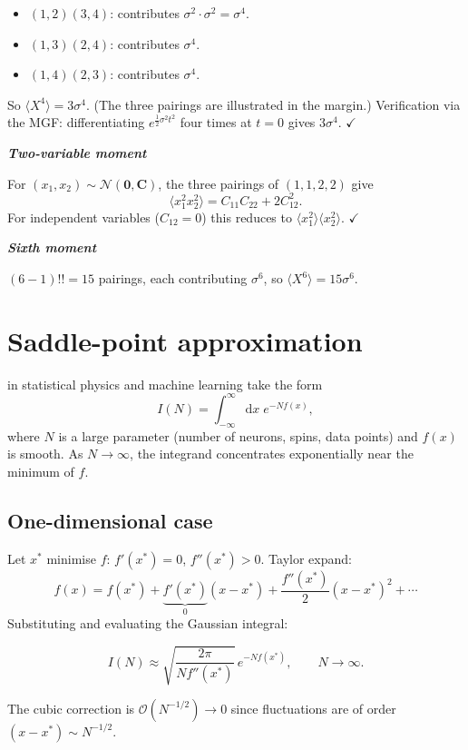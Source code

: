 \documentclass[justified,notoc]{tufte-handout}
\def\d{\mathrm{d}}
\def\N{\mathcal{N}}
\renewcommand{\vec}[1]{\mathbf{#1}}
\begin{document}
\begin{itemize}[leftmargin=*]
  \item $(1,2)(3,4)$: contributes $\sigma^2\cdot\sigma^2=\sigma^4$.
  \item $(1,3)(2,4)$: contributes $\sigma^4$.
  \item $(1,4)(2,3)$: contributes $\sigma^4$.
\end{itemize}
So $\langle X^4\rangle=3\sigma^4$. (The three pairings are illustrated in the margin.) Verification via the MGF: differentiating $e^{\frac{1}{2}\sigma^2 t^2}$ four times at $t=0$ gives $3\sigma^4$. $\checkmark$

\noindent\textit{\textbf{Two-variable moment}}\quad

For $(x_1,x_2)\sim\N(\vec{0},\mathbf{C})$, the three pairings of $(1,1,2,2)$ give
\begin{equation}
  \langle x_1^2 x_2^2\rangle=C_{11}C_{22}+2C_{12}^2.
\end{equation}
For independent variables ($C_{12}=0$) this reduces to $\langle x_1^2\rangle\langle x_2^2\rangle$. $\checkmark$

\noindent\textit{\textbf{Sixth moment}}\quad

$(6-1)!!=15$ pairings, each contributing $\sigma^6$, so $\langle X^6\rangle=15\sigma^6$.

\section{Saddle-point approximation}
\label{sec:saddle_point}

 in statistical physics and machine learning take the form
\begin{equation}
  I(N)=\int_{-\infty}^{\infty}\d x\; e^{-Nf(x)},
  \label{eq:laplace_integral}
\end{equation}
where $N$ is a large parameter (number of neurons, spins, data points) and $f(x)$ is smooth. As $N\to\infty$, the integrand concentrates exponentially near the minimum of $f$.

\subsection{One-dimensional case}

Let $x^*$ minimise $f$: $f'(x^*)=0$, $f''(x^*)>0$. Taylor expand:
\begin{equation}
  f(x)=f(x^*)+\underbrace{f'(x^*)}_{0}(x-x^*)+\frac{f''(x^*)}{2}(x-x^*)^2+\cdots
\end{equation}
Substituting and evaluating the Gaussian integral:
\begin{keyresult}
\begin{equation}
  I(N)\approx\sqrt{\frac{2\pi}{Nf''(x^*)}}\,e^{-Nf(x^*)}, \qquad N\to\infty.
  \label{eq:saddle_point_1d}
\end{equation}
\end{keyresult}
The cubic correction is $\mathcal{O}(N^{-1/2})\to 0$ since fluctuations are of order $(x-x^*)\sim N^{-1/2}$.
\end{document}
